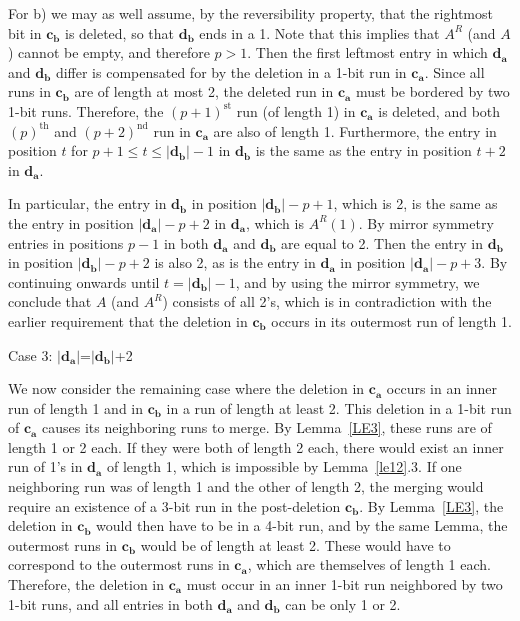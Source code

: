 For b) we may as well assume, by the reversibility property, that
the rightmost bit in $\mathbf{c_b}$ is deleted, so that
$\mathbf{d_b}$ ends in a 1. Note that this implies that $A^R$ (and
$A$) cannot be empty, and therefore $p>1$. Then the first leftmost
entry in which $\mathbf{d_a}$ and $\mathbf{d_b}$ differ is
compensated for by the deletion in a 1-bit run in $\mathbf{c_a}$.
Since all runs in $\mathbf{c_b}$ are of length at most 2, the
deleted run in $\mathbf{c_a}$ must be bordered by two 1-bit runs.
Therefore, the $(p+1)^{\text{st}}$ run (of length 1) in
$\mathbf{c_a}$ is deleted, and both $(p)^{\text{th}}$ and
$(p+2)^{\text{nd}}$ run in $\mathbf{c_a}$ are also of length 1.
Furthermore, the entry in position $t$ for $p+1 \leq t \leq
|\mathbf{d_b}|-1$ in $\mathbf{d_b}$ is the same as the entry in
position $t+2$ in $\mathbf{d_a}$.

In particular, the entry in $\mathbf{d_b}$ in position
$|\mathbf{d_b}|-p+1$, which is 2, is the same as the entry in
position $|\mathbf{d_a}|-p+2$ in $\mathbf{d_a}$, which is
$A^R(1)$. By mirror symmetry entries in positions $p-1$ in both
$\mathbf{d_a}$ and $\mathbf{d_b}$ are equal to 2. Then the entry
in $\mathbf{d_b}$ in position $|\mathbf{d_b}|-p+2$ is also 2, as
is the entry in $\mathbf{d_a}$ in position $|\mathbf{d_a}|-p+3$.
By continuing onwards until $t = |\mathbf{d_b}|-1$, and by using
the mirror symmetry, we conclude that $A$ (and $A^R$) consists of
all 2's, which is in contradiction with the earlier requirement
that the deletion in $\mathbf{c_b}$ occurs in its outermost run of
length 1.


Case 3: $|\mathbf{d_a}|$=$|\mathbf{d_b}|$+2

We now consider the remaining case where the deletion in
$\mathbf{c_a}$ occurs in an inner run of length 1 and in
$\mathbf{c_b}$ in a run of length at least 2. This deletion in a
1-bit run of $\mathbf{c_a}$ causes its neighboring runs to merge.
By Lemma~\ref{LE3}, these runs are of length 1 or 2 each. If they
were both of length 2 each, there would exist an inner run of 1's
in $\mathbf{d_a}$ of length 1, which is impossible by
Lemma~\ref{le12}.3. If one neighboring run was of length 1 and the
other of length 2, the merging would require an existence of a
3-bit run in the post-deletion $\mathbf{c_b}$. By Lemma~\ref{LE3},
the deletion in $\mathbf{c_b}$ would then have to be in a 4-bit
run, and by the same Lemma, the outermost runs in $\mathbf{c_b}$
would be of length at least 2. These would have to correspond to
the outermost runs in $\mathbf{c_a}$, which are themselves of
length 1 each. Therefore, the deletion in $\mathbf{c_a}$ must
occur in an inner 1-bit run neighbored by two 1-bit runs, and all
entries in both $\mathbf{d_a}$ and $\mathbf{d_b}$ can be only 1 or
2.


